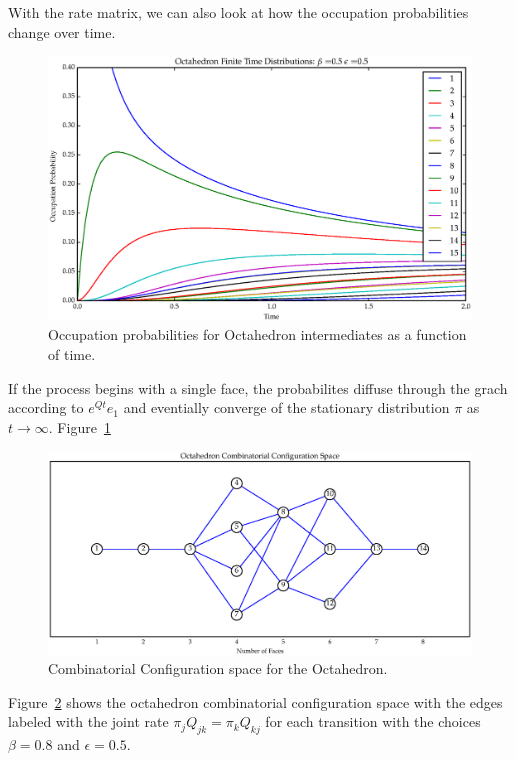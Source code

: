 With the rate matrix, we can also look at how the occupation probabilities change over time. 
\begin{figure}[ht]
\label{fig:OctaFinDist}
\centering
  \includegraphics[scale=0.6]{images/octahedron_finite_dist.eps}
\caption{Occupation probabilities for Octahedron intermediates as a function of time.}
\end{figure}
If the process begins with a single face, the probabilites diffuse through the grach according to $e^{Qt}e_1$ and eventially converge of the stationary distribution $\pi$ as $t \to \infty$. Figure~\ref{fig:OctaFinDist}

\begin{figure}[ht]
\label{fig:OctaCCS}
\centering
  \includegraphics[scale=0.6]{images/octahedron_ccs.eps}
\caption{Combinatorial Configuration space for the Octahedron.}
\end{figure}

Figure~\ref{fig:OctaCCS} shows the octahedron combinatorial configuration space with the edges labeled with the joint rate $\pi_j Q_{jk} = \pi_k Q_{kj}$ for each transition with the choices $\beta = 0.8$ and $\epsilon = 0.5$.


